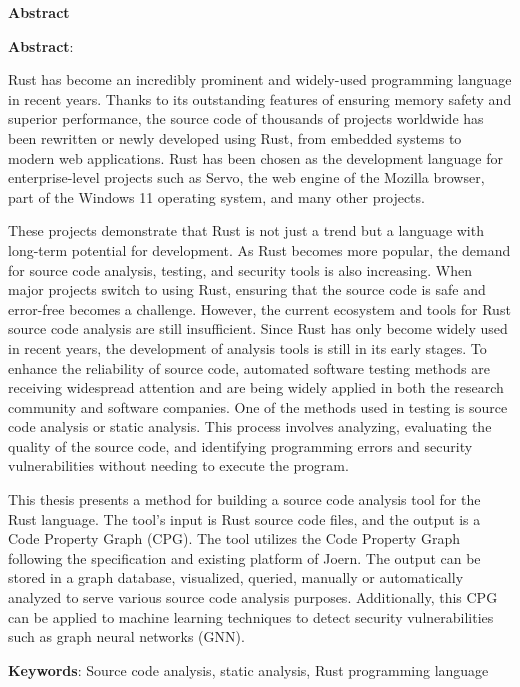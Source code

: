 \begin{center}
\textbf{\large{Abstract}	}
\end{center}

\begin{small}

\textbf{Abstract}:

Rust has become an incredibly prominent and widely-used programming language in recent years.
Thanks to its outstanding features of ensuring memory safety and superior performance, the source code of thousands of projects worldwide has been rewritten or newly developed using Rust, from embedded systems to modern web applications.
Rust has been chosen as the development language for enterprise-level projects such as Servo, the web engine of the Mozilla browser, part of the Windows 11 operating system, and many other projects.

These projects demonstrate that Rust is not just a trend but a language with long-term potential for development.
As Rust becomes more popular, the demand for source code analysis, testing, and security tools is also increasing.
When major projects switch to using Rust, ensuring that the source code is safe and error-free becomes a challenge.
However, the current ecosystem and tools for Rust source code analysis are still insufficient.
Since Rust has only become widely used in recent years, the development of analysis tools is still in its early stages.
To enhance the reliability of source code, automated software testing methods are receiving widespread attention and are being widely applied in both the research community and software companies.
One of the methods used in testing is source code analysis or static analysis.
This process involves analyzing, evaluating the quality of the source code, and identifying programming errors and security vulnerabilities without needing to execute the program.

This thesis presents a method for building a source code analysis tool for the Rust language.
The tool's input is Rust source code files, and the output is a Code Property Graph (CPG).
The tool utilizes the Code Property Graph following the specification and existing platform of Joern.
The output can be stored in a graph database, visualized, queried, manually or automatically analyzed to serve various source code analysis purposes.
Additionally, this CPG can be applied to machine learning techniques to detect security vulnerabilities such as graph neural networks (GNN).

\vspace*{1cm}
\textbf{Keywords}: Source code analysis, static analysis, Rust programming language
\end{small}